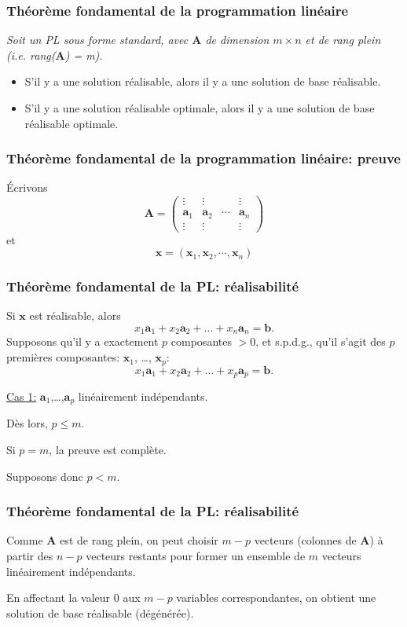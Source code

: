 \documentclass[usepdftitle=false]{beamer}
\def\ba{\boldsymbol{a}}
\def\bb{\boldsymbol{b}}
\def\bx{\boldsymbol{x}}
\def\bA{\boldsymbol{A}}
\begin{document}
\begin{frame}
\frametitle{Théorème fondamental de la programmation linéaire}

{\it
Soit un PL sous forme standard, avec $\bA$ de dimension $m \times n$ et de rang plein (i.e. rang($\bA$) = m).
\begin{itemize}
\item
S'il y a une solution réalisable, alors il y a une solution de base réalisable.
\item
S'il y a une solution réalisable optimale, alors il y a une solution de base réalisable optimale.
\end{itemize}
}

\end{frame}

\begin{frame}
\frametitle{Théorème fondamental de la programmation linéaire: preuve}

Écrivons
\[
\bA =
\begin{pmatrix}
\vdots & \vdots & & \vdots \\
\ba_1 & \ba_2 & \cdots & \ba_n \\
\vdots & \vdots & & \vdots
\end{pmatrix}
\]
et
\[
\bx = ( \bx_1, \bx_2, \cdots, \bx_n )
\]
\end{frame}

\begin{frame}
\frametitle{Théorème fondamental de la PL: réalisabilité}

Si $\bx$ est réalisable, alors
\[
x_1 \ba_1 + x_2 \ba_2 + \ldots + x_n \ba_n = \bb.
\]
Supposons qu'il y a exactement $p$ composantes $> 0$, et s.p.d.g., qu'il s'agit des $p$ premières composantes: $\bx_1$, \ldots, $\bx_p$:
\[
x_1 \ba_1 + x_2 \ba_2 + \ldots + x_p \ba_p = \bb.
\]

\mbox{}

\underline{Cas 1:} $\ba_1$,\ldots,$\ba_p$ linéairement indépendants.

Dès lors, $p \leq m$.

Si $p = m$, la preuve est complète.

Supposons donc $p < m$.
\end{frame}

\begin{frame}
\frametitle{Théorème fondamental de la PL: réalisabilité}

Comme $\bA$ est de rang plein, on peut choisir $m-p$ vecteurs (colonnes de $\bA$) à partir des $n-p$ vecteurs restants pour former un ensemble de $m$ vecteurs linéairement indépendants.

\mbox{}

En affectant la valeur 0 aux $m-p$ variables correspondantes, on obtient une solution de base réalisable (dégénérée). 
\end{frame}
\end{document}
